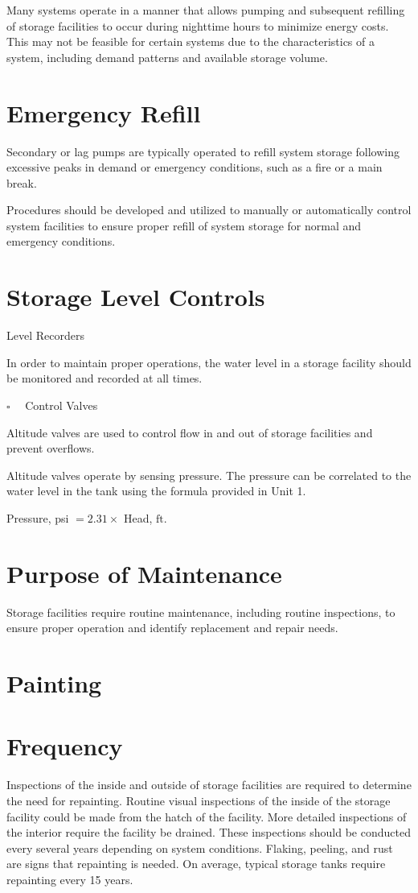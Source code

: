 \documentclass[10pt]{article}
\begin{document}
Many systems operate in a manner that allows pumping and subsequent refilling of storage facilities to occur during nighttime hours to minimize energy costs. This may not be feasible for certain systems due to the characteristics of a system, including demand patterns and available storage volume.

\section{Emergency Refill}
Secondary or lag pumps are typically operated to refill system storage following excessive peaks in demand or emergency conditions, such as a fire or a main break.

Procedures should be developed and utilized to manually or automatically control system facilities to ensure proper refill of system storage for normal and emergency conditions.

\section{Storage Level Controls}
Level Recorders

In order to maintain proper operations, the water level in a storage facility should be monitored and recorded at all times.

$\square \quad$ Control Valves

Altitude valves are used to control flow in and out of storage facilities and prevent overflows.

Altitude valves operate by sensing pressure. The pressure can be correlated to the water level in the tank using the formula provided in Unit 1.

Pressure, psi $=2.31 \times$ Head, $\mathrm{ft}$.

\section{Purpose of Maintenance}
Storage facilities require routine maintenance, including routine inspections, to ensure proper operation and identify replacement and repair needs.

\section{Painting}
\section{Frequency}
Inspections of the inside and outside of storage facilities are required to determine the need for repainting. Routine visual inspections of the inside of the storage facility could be made from the hatch of the facility. More detailed inspections of the interior require the facility be drained. These inspections should be conducted every several years depending on system conditions. Flaking, peeling, and rust are signs that repainting is needed. On average, typical storage tanks require repainting every 15 years.
\end{document}
